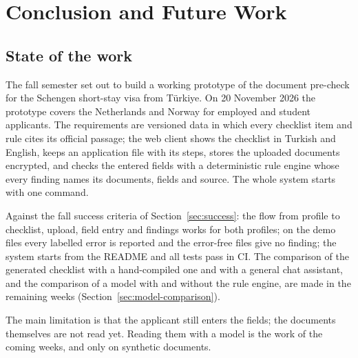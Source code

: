 \chapter{Conclusion and Future Work}\label{ch:conclusion}

\section{State of the work}
The fall semester set out to build a working prototype of the document pre-check for the
Schengen short-stay visa from Türkiye. On 20 November 2026 the prototype covers the Netherlands
and Norway for employed and student applicants. The requirements are versioned data in which
every checklist item and rule cites its official passage; the web client shows the checklist in
Turkish and English, keeps an application file with its steps, stores the uploaded documents
encrypted, and checks the entered fields with a deterministic rule engine whose every finding
names its documents, fields and source. The whole system starts with one command.

Against the fall success criteria of Section~\ref{sec:success}: the flow from profile to
checklist, upload, field entry and findings works for both profiles; on the demo files every
labelled error is reported and the error-free files give no finding; the system starts from the
README and all tests pass in CI. The comparison of the generated checklist with a hand-compiled
one and with a general chat assistant, and the comparison of a model with and without the rule
engine, are made in the remaining weeks (Section~\ref{sec:model-comparison}).

The main limitation is that the applicant still enters the fields; the documents themselves are
not read yet. Reading them with a model is the work of the coming weeks, and only on synthetic
documents.

